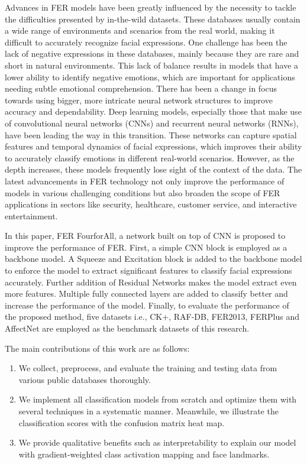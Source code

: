 Advances in FER models have been greatly influenced by the necessity to tackle the difficulties presented by in-the-wild datasets. These databases usually contain a wide range of environments and scenarios from the real world, making it difficult to accurately recognize facial expressions. One challenge has been the lack of negative expressions in these databases, mainly because they are rare and short in natural environments. This lack of balance results in models that have a lower ability to identify negative emotions, which are important for applications needing subtle emotional comprehension.
There has been a change in focus towards using bigger, more intricate neural network structures to improve accuracy and dependability. Deep learning models, especially those that make use of convolutional neural networks (CNNs) and recurrent neural networks (RNNs), have been leading the way in this transition. These networks can capture spatial features and temporal dynamics of facial expressions, which improves their ability to accurately classify emotions in different real-world scenarios. However, as the depth increases, these models frequently lose sight of the context of the data.
The latest advancements in FER technology not only improve the performance of models in various challenging conditions but also broaden the scope of FER applications in sectors like security, healthcare, customer service, and interactive entertainment.

In this paper, FER FourforAll, a network built on top of CNN is proposed to improve the performance of FER. First, a simple CNN block is employed as a backbone model. A Squeeze and Excitation block is added to the backbone model to enforce the model to extract significant features to classify facial expressions accurately. Further addition of Residual Networks \cite{he2016deep} makes the model extract even more features. Multiple fully connected layers are added to classify better and increase the performance of the model.
Finally, to evaluate the performance of the proposed method, five datasets i.e., CK+, RAF-DB, FER2013, FERPlus and AffectNet are employed as the benchmark datasets of this research.

The main contributions of this work are as follows:
\begin{enumerate}
	\item We collect, preprocess, and evaluate the training and testing data from various public databases thoroughly.
	\item We implement all classification models from scratch and optimize them with several techniques in a systematic manner. Meanwhile, we illustrate the classification scores with the confusion matrix heat map.
	\item We provide qualitative benefits such as interpretability to explain our model with gradient-weighted class activation mapping and face landmarks.
\end{enumerate}
